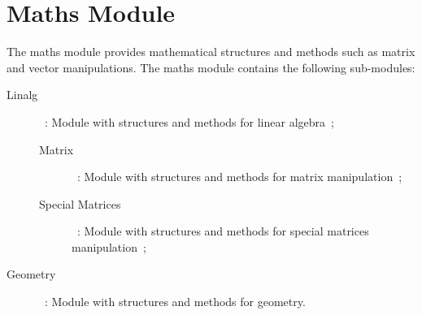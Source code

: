 \chapter{Maths Module}
\label{cha:maths}

The maths module provides mathematical structures and methods such as matrix and vector manipulations. The maths module contains the following sub-modules:

\begin{description}
  \item[Linalg]~: Module with structures and methods for linear algebra~;
    \begin{description}
      \item[Matrix]~: Module with structures and methods for matrix manipulation~;
      \item[Special Matrices]~: Module with structures and methods for special matrices manipulation~;
    \end{description}
  \item[Geometry]~: Module with structures and methods for geometry.
\end{description}



